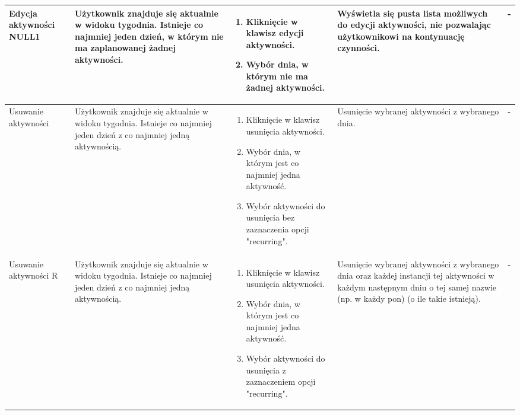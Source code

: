 \documentclass{article}
\begin{document}
\begin{longtable}[H]{| m{3.5cm} | m{3.5cm} | m{3.5cm} | m{3.5cm} | m{3.5cm} |}
	Edycja aktywności NULL1 & Użytkownik znajduje się aktualnie w widoku tygodnia. Istnieje co najmniej jeden dzień, w którym nie ma zaplanowanej żadnej aktywności. & 
	\begin{enumerate}[leftmargin =*, topsep=0pt] \item Kliknięcie w klawisz edycji aktywności. \item Wybór dnia, w którym nie ma żadnej aktywności.\end{enumerate} & Wyświetla się pusta lista 
	możliwych do edycji aktywności, nie pozwalając użytkownikowi na kontynuację czynności. & - \\ \hline
	

	Usuwanie aktywności & Użytkownik znajduje się aktualnie w widoku tygodnia. Istnieje co najmniej jeden dzień z co najmniej jedną aktywnością. & \begin{enumerate}[leftmargin =*, topsep=0pt] 
	\item Kliknięcie w klawisz usunięcia aktywności. \item Wybór dnia, w którym jest co najmniej jedna aktywność. \item Wybór aktywności do usunięcia bez zaznaczenia opcji "recurring". 
	\end{enumerate} & Usunięcie wybranej aktywności z wybranego dnia. & - \\ \hline

	Usuwanie aktywności R & Użytkownik znajduje się aktualnie w widoku tygodnia. Istnieje co najmniej jeden dzień z co najmniej jedną aktywnością. & \begin{enumerate}[leftmargin =*, topsep=0pt] 
	\item Kliknięcie w klawisz usunięcia aktywności. \item Wybór dnia, w którym jest co najmniej jedna aktywność. \item Wybór aktywności do usunięcia z zaznaczeniem opcji "recurring". 
	\end{enumerate} & Usunięcie wybranej aktywności z wybranego dnia oraz każdej instancji tej aktywności w każdym następnym dniu o tej samej nazwie (np. w każdy pon) (o ile takie istnieją). & 
	- \\ \hline


\end{longtable}
\end{document}
